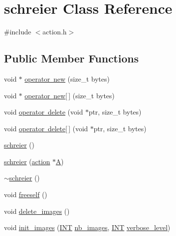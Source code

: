\hypertarget{classschreier}{}\section{schreier Class Reference}
\label{classschreier}


{\ttfamily \#include $<$action.\+h$>$}

\subsection*{Public Member Functions}
\begin{DoxyCompactItemize}
\item 
void $\ast$ \mbox{\hyperlink{classschreier_a37f34367973fd790fac4a4e8d5aafff5}{operator new}} (size\+\_\+t bytes)
\item 
void $\ast$ \mbox{\hyperlink{classschreier_a9cfbb1bf282b35b534502fbdf0973b44}{operator new\mbox{[}$\,$\mbox{]}}} (size\+\_\+t bytes)
\item 
void \mbox{\hyperlink{classschreier_a4a23798df88ed8876770faedc091b858}{operator delete}} (void $\ast$ptr, size\+\_\+t bytes)
\item 
void \mbox{\hyperlink{classschreier_a402c6bf337fe87c2729220776020d2f1}{operator delete\mbox{[}$\,$\mbox{]}}} (void $\ast$ptr, size\+\_\+t bytes)
\item 
\mbox{\hyperlink{classschreier_ab0e866eee2f4ed304d7c1ca79ba68c3c}{schreier}} ()
\item 
\mbox{\hyperlink{classschreier_a3731bbef958ef47b0f67f6a5c97c0daf}{schreier}} (\mbox{\hyperlink{classaction}{action}} $\ast$\mbox{\hyperlink{classschreier_a1a33e8aaeb25635fbb26da7730bff499}{A}})
\item 
\mbox{\hyperlink{classschreier_ad4f73b9123bc16978b4ab4d75f915d65}{$\sim$schreier}} ()
\item 
void \mbox{\hyperlink{classschreier_aa3e8a3de78a5bb08b1035e5a793b4129}{freeself}} ()
\item 
void \mbox{\hyperlink{classschreier_abdd236da6354b3a5a8e83532e41f7fc3}{delete\+\_\+images}} ()
\item 
void \mbox{\hyperlink{classschreier_a18706665fcf3e66a503373f2eef8fe21}{init\+\_\+images}} (\mbox{\hyperlink{galois_8h_a09fddde158a3a20bd2dcadb609de11dc}{I\+NT}} \mbox{\hyperlink{classschreier_a3bf9949b18b9c360998bdd75beff2cd9}{nb\+\_\+images}}, \mbox{\hyperlink{galois_8h_a09fddde158a3a20bd2dcadb609de11dc}{I\+NT}} \mbox{\hyperlink{simeon_8_c_a818073fbcc2f439e7c56952f67386122}{verbose\+\_\+level}})
\item 

\end{DoxyCompactItemize}

